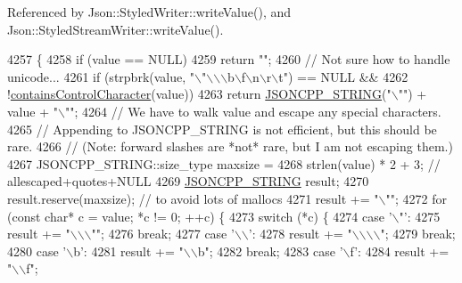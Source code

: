 Referenced by Json\+::\+Styled\+Writer\+::write\+Value(), and Json\+::\+Styled\+Stream\+Writer\+::write\+Value().


\begin{DoxyCode}
4257                                                       \{
4258   \textcolor{keywordflow}{if} (value == NULL)
4259     \textcolor{keywordflow}{return} \textcolor{stringliteral}{""};
4260   \textcolor{comment}{// Not sure how to handle unicode...}
4261   \textcolor{keywordflow}{if} (strpbrk(value, \textcolor{stringliteral}{"\(\backslash\)"\(\backslash\)\(\backslash\)\(\backslash\)b\(\backslash\)f\(\backslash\)n\(\backslash\)r\(\backslash\)t"}) == NULL &&
4262       !\hyperlink{namespace_json_aa11b210ff98a4f4dd4e2df19260f8c3a}{containsControlCharacter}(value))
4263     \textcolor{keywordflow}{return} \hyperlink{json_8h_a1e723f95759de062585bc4a8fd3fa4be}{JSONCPP\_STRING}(\textcolor{stringliteral}{"\(\backslash\)""}) + value + \textcolor{stringliteral}{"\(\backslash\)""};
4264   \textcolor{comment}{// We have to walk value and escape any special characters.}
4265   \textcolor{comment}{// Appending to JSONCPP\_STRING is not efficient, but this should be rare.}
4266   \textcolor{comment}{// (Note: forward slashes are *not* rare, but I am not escaping them.)}
4267   JSONCPP\_STRING::size\_type maxsize =
4268       strlen(value) * 2 + 3; \textcolor{comment}{// allescaped+quotes+NULL}
4269   \hyperlink{json_8h_a1e723f95759de062585bc4a8fd3fa4be}{JSONCPP\_STRING} result;
4270   result.reserve(maxsize); \textcolor{comment}{// to avoid lots of mallocs}
4271   result += \textcolor{stringliteral}{"\(\backslash\)""};
4272   \textcolor{keywordflow}{for} (\textcolor{keyword}{const} \textcolor{keywordtype}{char}* c = value; *c != 0; ++c) \{
4273     \textcolor{keywordflow}{switch} (*c) \{
4274     \textcolor{keywordflow}{case} \textcolor{charliteral}{'\(\backslash\)"'}:
4275       result += \textcolor{stringliteral}{"\(\backslash\)\(\backslash\)\(\backslash\)""};
4276       \textcolor{keywordflow}{break};
4277     \textcolor{keywordflow}{case} \textcolor{charliteral}{'\(\backslash\)\(\backslash\)'}:
4278       result += \textcolor{stringliteral}{"\(\backslash\)\(\backslash\)\(\backslash\)\(\backslash\)"};
4279       \textcolor{keywordflow}{break};
4280     \textcolor{keywordflow}{case} \textcolor{charliteral}{'\(\backslash\)b'}:
4281       result += \textcolor{stringliteral}{"\(\backslash\)\(\backslash\)b"};
4282       \textcolor{keywordflow}{break};
4283     \textcolor{keywordflow}{case} \textcolor{charliteral}{'\(\backslash\)f'}:
4284       result += \textcolor{stringliteral}{"\(\backslash\)\(\backslash\)f"};

\end{DoxyCode}
